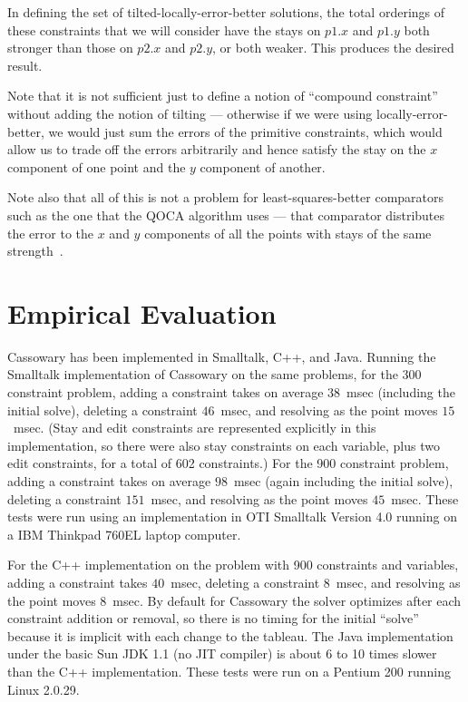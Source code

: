 \documentclass{article}
\begin{document}
In defining the set of tilted-locally-error-better solutions, the total
orderings of these constraints that we will consider have the stays on
$p1.x$ and $p1.y$ both stronger than those on $p2.x$ and $p2.y$, or both
weaker.  This produces the desired result.

Note that it is not sufficient just to define a notion of ``compound
constraint'' without adding the notion of tilting --- otherwise if we were
using locally-error-better, we would just sum the errors of the 
primitive constraints, which would allow us to trade off the errors
arbitrarily and hence satisfy the stay on the $x$ component of one point
and the $y$ component of another.

Note also that all of this is not a problem for least-squares-better
comparators such as the one that the QOCA algorithm uses --- that
comparator distributes the error to the $x$ and $y$ components of all
the points with stays of the same strength~\cite{borning-simplex-tr}.

\section{Empirical Evaluation}
\label{empirical-evaluation}

Cassowary has been implemented in Smalltalk, C++, and Java.
Running the Smalltalk implementation of Cassowary on the same problems, 
for the 300 constraint problem,
adding a constraint takes on average $38$~msec (including the initial
solve), deleting a constraint $46$~msec, and resolving as the point moves
$15$~msec.  (Stay and edit constraints are represented explicitly in this
implementation, so there were also stay constraints on each variable, plus
two edit constraints, for a total of 602 constraints.)
For the 900 constraint problem, adding a constraint takes on
average $98$~msec (again including the initial solve), deleting a
constraint $151$~msec, and resolving as the point moves $45$~msec.  These
tests were run using an implementation in OTI Smalltalk Version 4.0 running
on a IBM Thinkpad 760EL laptop computer.

For the C++ implementation on the problem with 900
constraints and variables, adding a constraint takes $40$~msec, deleting 
a constraint $8$~msec, and resolving as the point moves $8$~msec.  By
default for Cassowary the solver optimizes after each constraint
addition or removal, so there is no timing for the initial ``solve''
because it is implicit with each change to the tableau.  The Java
implementation under the basic Sun JDK 1.1 (no JIT compiler) is about
6 to 10 times slower than the C++ implementation.  These tests were run
on a Pentium 200 running Linux 2.0.29.
\end{document}
